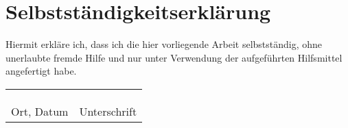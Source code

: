 
\chapter*{Selbstständigkeitserklärung}
Hiermit erkläre ich, dass ich die hier vorliegende Arbeit selbstständig,
ohne unerlaubte fremde Hilfe und nur unter Verwendung der aufgeführten
Hilfsmittel angefertigt habe.

\begin{tabular}{p{6cm}p{7cm}}
	\\
  \\
  \\
  \\
  Ort, Datum& Unterschrift
\end{tabular}

